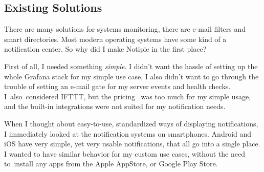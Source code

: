\subsection{Existing Solutions}\label{sec:existing-solutions}

There are many solutions
for systems monitoring,
there are e-mail filters
and smart directories.
Most modern operating systems have some kind of a notification center.
So why did I make Notipie in the first place?

First of all,
I needed something \emph{simple}.
I didn't want the hassle of setting up
the whole Grafana stack for my simple use case,
I also didn't want to go through the trouble
of setting an e-mail gate
for my server events and health checks.
I~also~considered IFTTT,
but the pricing~\cite{ifttt_plans_2022}
was too much for my simple usage,
and the built-in integrations
were not suited for my notification needs.

When I thought about easy-to-use,
standardized ways of displaying notifications,
I immediately looked at
the notification systems on smartphones.
Android and iOS have very simple,
yet very usable notifications,
that all go into a single place.
I wanted to have similar behavior
for my custom use cases,
without the need to~install any apps
from the Apple AppStore,
or Google Play Store.
